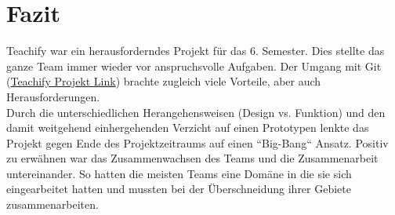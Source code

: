 \section{Fazit}
Teachify war ein herausforderndes Projekt für das 6. Semester. Dies stellte das ganze Team immer wieder vor anspruchsvolle Aufgaben. Der Umgang mit Git (\href{https://github.com/cpfeiffer3008/Teachify}{Teachify Projekt Link}) brachte zugleich viele Vorteile, aber auch Herausforderungen.\\
Durch die unterschiedlichen Herangehensweisen (Design vs. Funktion) und den damit weitgehend einhergehenden Verzicht auf einen Prototypen lenkte das Projekt gegen Ende des Projektzeitraums auf einen ``Big-Bang`` Ansatz.
Positiv zu erwähnen war das Zusammenwachsen des Teams und die Zusammenarbeit untereinander. So hatten die meisten Teams eine Domäne in die sie sich eingearbeitet hatten und mussten bei der Überschneidung ihrer Gebiete zusammenarbeiten.